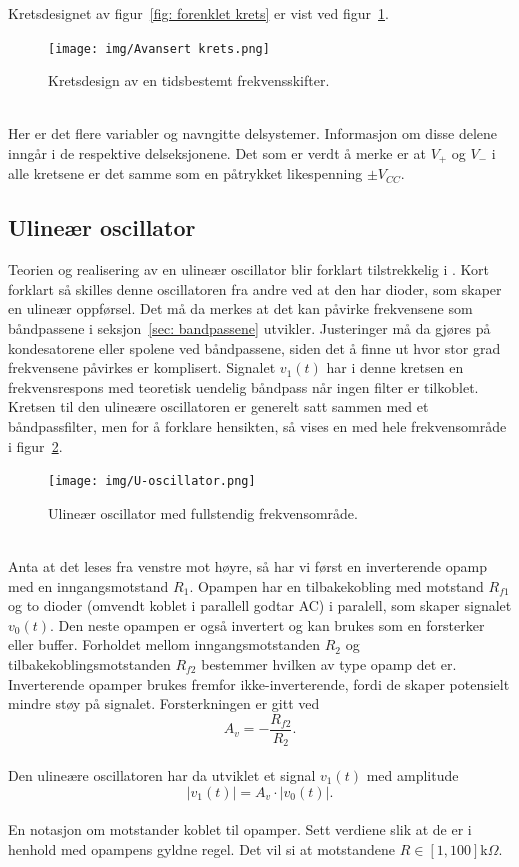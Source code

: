 \documentclass[a4paper,11pt,norsk]{article}
\begin{document}
\newpage
Kretsdesignet av figur~\ref{fig: forenklet krets} er vist ved figur~\ref{fig: avansert krets}.  \\
\begin{figure}[!htbp]
    \centering
    \texttt{[image: img/Avansert krets.png]}
    \caption{Kretsdesign av en tidsbestemt frekvensskifter.}
    \label{fig: avansert krets}
\end{figure} \\
Her er det flere variabler og navngitte delsystemer. Informasjon om disse delene inngår i de respektive delseksjonene. Det som er verdt å merke er at $V_+$ og $V_-$ i alle kretsene er det samme som en påtrykket likespenning $\pm V_{CC}$.
\newpage
\subsection{Ulineær oscillator}\label{sec: U-oscillator}
Teorien og realisering av en ulineær oscillator blir forklart tilstrekkelig i \cite{U-oscillator}. Kort forklart så skilles denne oscillatoren fra andre ved at den har dioder, som skaper en ulineær oppførsel. Det må da merkes at det kan påvirke frekvensene som båndpassene i seksjon~\ref{sec: bandpassene} utvikler. Justeringer må da gjøres på kondesatorene eller spolene ved båndpassene, siden det å finne ut hvor stor grad frekvensene påvirkes er komplisert. Signalet $v_1(t)$ har i denne kretsen en frekvensrespons med teoretisk uendelig båndpass når ingen filter er tilkoblet.
\\
Kretsen til den ulineære oscillatoren er generelt satt sammen med et båndpassfilter, men for å forklare hensikten, så vises en med hele frekvensområde i figur~\ref{fig: U-oscillator}.
\begin{figure}[!htbp]
    \centering
    \texttt{[image: img/U-oscillator.png]}
    \caption{Ulineær oscillator med fullstendig frekvensområde.}
    \label{fig: U-oscillator}
\end{figure} \\
Anta at det leses fra venstre mot høyre, så har vi først en inverterende opamp med en inngangsmotstand $R_1$. Opampen har en tilbakekobling med motstand $R_{f1}$ og to dioder (omvendt koblet i parallell godtar AC) i paralell, som skaper signalet $v_0(t)$. Den neste opampen er også invertert og kan brukes som en forsterker eller buffer. Forholdet mellom inngangsmotstanden $R_2$ og tilbakekoblingsmotstanden $R_{f2}$ bestemmer hvilken av type opamp det er. Inverterende opamper brukes fremfor ikke-inverterende, fordi de skaper potensielt mindre støy på signalet.
Forsterkningen er gitt ved
\begin{equation}
    A_v = -\frac{R_{f2}}{R_2}.
\end{equation}\\
Den ulineære oscillatoren har da utviklet et signal $v_1(t)$ med amplitude
\begin{equation}
    |v_1(t)| = A_v \cdot |v_0(t)| .
\end{equation} \\
En notasjon om motstander koblet til opamper. Sett verdiene slik at de er i henhold med opampens gyldne regel. Det vil si at motstandene $R\in[1, 100]$k$\Omega$.
\newpage
\end{document}
